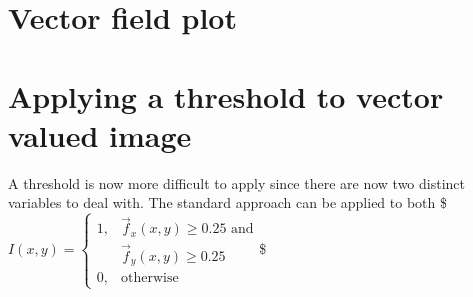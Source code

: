 \documentclass[letterpaper,10pt,english]{sphinxmanual}
\begin{document}
\noindent{}


\section{Vector field plot}
\label{\detokenize{04-BasicSegmentation:vector-field-plot}}
\begin{sphinxVerbatim}[commandchars=\\\{\}]
       
\PYG{p}{[}\PYG{p}{]} \PYG{p}{[}\PYG{p}{]} \PYG{p}{[}\PYG{p}{]} \PYG{p}{[}\PYG{p}{]} \PYG{p}{[}\PYG{p}{]}   
\end{sphinxVerbatim}

\noindent{}


\section{Applying a threshold to vector valued image}
\label{\detokenize{04-BasicSegmentation:applying-a-threshold-to-vector-valued-image}}
\sphinxAtStartPar
A threshold is now more difficult to apply since there are now two distinct variables to deal with. The standard approach can be applied to both
\$\( I(x,y) = 
\begin{cases}
1, & \vec{f}_x(x,y) \geq0.25 \text{ and}\\
& \vec{f}_y(x,y) \geq0.25 \\
0, & \text{otherwise}
\end{cases}\)\$
\end{document}
